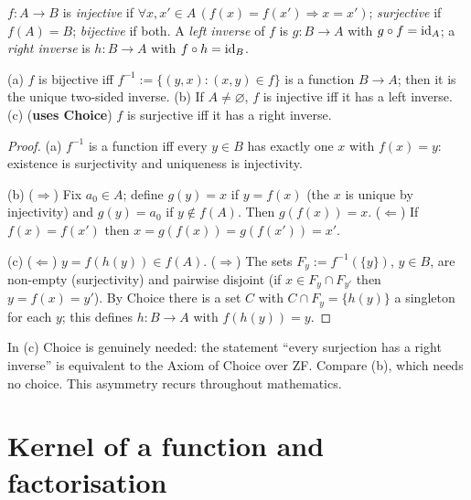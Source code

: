 \begin{definition}
	$f:A\to B$ is \emph{injective} if $\forall x,x'\in A\,(f(x)=f(x')\Rightarrow x=x')$; \emph{surjective} if $f(A)=B$; \emph{bijective} if both. A \emph{left inverse} of $f$ is $g:B\to A$ with $g\circ f=\operatorname{id}_A$; a \emph{right inverse} is $h:B\to A$ with $f\circ h=\operatorname{id}_B$.
\end{definition}

\begin{theorem}\label{thm:bijection}
	(a) $f$ is bijective iff $f^{-1}:=\{(y,x):(x,y)\in f\}$ is a function $B\to A$; then it is the unique two-sided inverse. (b) If $A\ne\varnothing$, $f$ is injective iff it has a left inverse. (c) (\textbf{uses Choice}) $f$ is surjective iff it has a right inverse.
\end{theorem}
\begin{proof}
	(a) $f^{-1}$ is a function iff every $y\in B$ has exactly one $x$ with $f(x)=y$: existence is surjectivity and uniqueness is injectivity.
	
	(b) ($\Rightarrow$) Fix $a_0\in A$; define $g(y)=x$ if $y=f(x)$ (the $x$ is unique by injectivity) and $g(y)=a_0$ if $y\notin f(A)$. Then $g(f(x))=x$. ($\Leftarrow$) If $f(x)=f(x')$ then $x=g(f(x))=g(f(x'))=x'$.
	
	(c) ($\Leftarrow$) $y=f(h(y))\in f(A)$. ($\Rightarrow$) The sets $F_y:=f^{-1}(\{y\})$, $y\in B$, are non-empty (surjectivity) and pairwise disjoint (if $x\in F_y\cap F_{y'}$ then $y=f(x)=y'$). By Choice there is a set $C$ with $C\cap F_y=\{h(y)\}$ a singleton for each $y$; this defines $h:B\to A$ with $f(h(y))=y$.
\end{proof}

\begin{remark}
	In (c) Choice is genuinely needed: the statement ``every surjection has a right inverse'' is equivalent to the Axiom of Choice over ZF. Compare (b), which needs no choice. This asymmetry recurs throughout mathematics.
\end{remark}

\section{Kernel of a function and factorisation}

